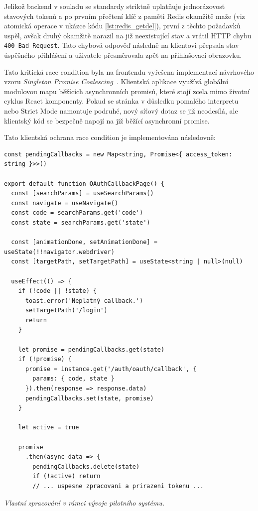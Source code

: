 \documentclass[male,czech,api_bc]{kitheses}
\newcommand{\zdroj}[1]{%
    \vspace{1ex}%
    {\footnotesize \raggedright \textit{#1}\par}%
}
\begin{document}
Jelikož backend v souladu se standardy striktně uplatňuje jednorázovost stavových tokenů a po prvním přečtení klíč z paměti Redis okamžitě maže (viz atomická operace  v ukázce kódu \vref{lst:redis_getdel}), první z těchto požadavků uspěl, avšak druhý okamžitě narazil na již neexistující stav a vrátil HTTP chybu \texttt{400 Bad Request}. Tato chybová odpověď následně na klientovi přepsala stav úspěšného přihlášení a uživatele přesměrovala zpět na přihlašovací obrazovku.

Tato kritická race condition byla na frontendu vyřešena implementací návrhového vzoru \textit{Singleton Promise Coalescing}~\cite{Andrushchak202661}. Klientská aplikace využívá globální modulovou mapu běžících asynchronních promisů, které stojí zcela mimo životní cyklus React komponenty. Pokud se stránka v důsledku pomalého interpretu nebo Strict Mode namontuje podruhé, nový síťový dotaz se již neodesílá, ale klientský kód se bezpečně napojí na již běžící asynchronní promise.

Tato klientská ochrana race condition je implementována následovně:

\begin{listing}[htbp]
\begin{verbatim}
const pendingCallbacks = new Map<string, Promise<{ access_token: string }>>()

export default function OAuthCallbackPage() {
  const [searchParams] = useSearchParams()
  const navigate = useNavigate()
  const code = searchParams.get('code')
  const state = searchParams.get('state')

  const [animationDone, setAnimationDone] = useState(!!navigator.webdriver)
  const [targetPath, setTargetPath] = useState<string | null>(null)

  useEffect(() => {
    if (!code || !state) {
      toast.error('Neplatný callback.')
      setTargetPath('/login')
      return
    }

    let promise = pendingCallbacks.get(state)
    if (!promise) {
      promise = instance.get('/auth/oauth/callback', { 
        params: { code, state }
      }).then(response => response.data)
      pendingCallbacks.set(state, promise)
    }

    let active = true

    promise
      .then(async data => {
        pendingCallbacks.delete(state)
        if (!active) return
        // ... uspesne zpracovani a prirazeni tokenu ...
\end{verbatim}
\caption{Ochrana race condition pomocí Singleton Promise Coalescing}
\label{lst:promise_coalescing}
\zdroj{Vlastní zpracování v rámci vývoje pilotního systému.}
\end{listing}
\end{document}
